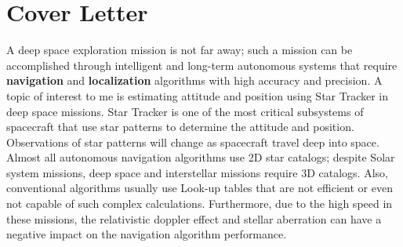 \documentclass[a4,15pt]{article}
\begin{document}
\section{\Large{Cover Letter} }
\vspace{0.2cm}
\justifying
    
\begin{large} 
\quad  A deep space exploration mission is not far away; such a mission can be accomplished through intelligent and long-term autonomous systems that require \textbf{navigation} and \textbf{localization} algorithms with high accuracy and precision. A topic of interest to me is estimating attitude and position using Star Tracker in deep space missions. Star Tracker is one of the most critical subsystems of spacecraft that use star patterns to determine the attitude and position. Observations of star patterns will change as spacecraft travel deep into space\cite{bailer2021lost}. Almost all autonomous navigation algorithms use 2D star catalogs; despite Solar system missions\cite{hallock2017acs}, deep space and interstellar missions require 3D catalogs. Also, conventional algorithms usually use Look-up tables that are not efficient or even not capable of such complex calculations. Furthermore, due to the high speed in these missions, the relativistic doppler effect and stellar aberration can have a negative impact on the navigation algorithm performance.  \par


\end{large}
\end{document}
